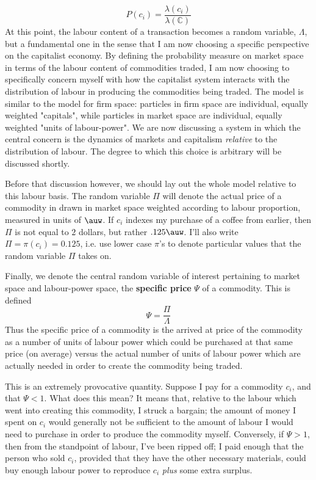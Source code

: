 \[ P(c_i) = \frac{\lambda(c_i)}{\lambda(\mathbb{C})} \]
At this point, the labour content of a transaction becomes a random variable, $\Lambda$, but a fundamental one in the sense that I am now choosing a specific perspective on the capitalist economy. By defining the probability measure on market space in terms of the labour content of commodities traded, I am now choosing to specifically concern myself with how the capitalist system interacts with the distribution of labour in producing the commodities being traded. The model is similar to the model for firm space: particles in firm space are individual, equally weighted "capitals", while particles in market space are individual, equally weighted "units of labour-power". We are now discussing a system in which the central concern is the dynamics of markets and capitalism \textit{relative} to the distribution of labour. The degree to which this choice is arbitrary will be discussed shortly. \par 
Before that discussion however, we should lay out the whole model relative to this labour basis. The random variable $\Pi$ will denote the actual price of a commodity in drawn in market space weighted according to labour proportion, measured in units of $\auw$. If $c_i$  indexes my purchase of a coffee from earlier, then $\Pi$ is not equal to $2$ dollars, but rather $.125 \auw$. I'll also write $\Pi = \pi(c_i) = 0.125$, i.e. use lower case $\pi$'s to denote particular values that the random variable $\Pi$ takes on. \par 
Finally, we denote the central random variable of interest pertaining to market space and labour-power space, the \textbf{specific price} $\Psi$ of a commodity. This is defined
\[ \Psi = \frac{\Pi}{\Lambda} \]
Thus the specific price of a commodity is the arrived at price of the commodity as a number of units of labour power which could be purchased at that same price (on average) versus the actual number of units of labour power which are actually needed in order to create the commodity being traded. \par 
This is an extremely provocative quantity. Suppose I pay for a commodity $c_i$, and that $\Psi < 1$. What does this mean? It means that, relative to the labour which went into creating this commodity, I struck a bargain; the amount of money I spent on $c_i$ would generally not be sufficient to the amount of labour I would need to purchase in order to produce the commodity myself. Conversely, if $\Psi > 1$, then from the standpoint of labour, I've been ripped off; I paid enough that the person who sold $c_i$, provided that they have the other necessary materials, could buy enough labour power to reproduce $c_i$ \textit{plus} some extra surplus. \par 
